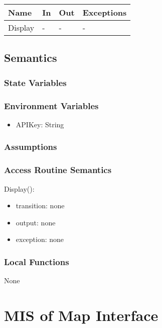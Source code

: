 \documentclass[12pt, titlepage]{article}
\begin{document}
\begin{itemize}
\begin{center}
\begin{tabular}{p{2cm} p{4cm} p{4cm} p{2cm}}
\hline
\textbf{Name} & \textbf{In} & \textbf{Out} & \textbf{Exceptions} \\
\hline
Display & - & - & - \\

\hline
\end{tabular}
\end{center}

\subsection{Semantics}

\subsubsection{State Variables}

\subsubsection{Environment Variables}

\begin{itemize}
\item APIKey: String
\end{itemize}

\subsubsection{Assumptions}

\subsubsection{Access Routine Semantics}

\noindent Display():
\begin{itemize}
\item transition: none
\item output: none
\item exception: none
\end{itemize}

\subsubsection{Local Functions}

None

\newpage

\section{MIS of Map Interface} \label{mMapInterface}


\end{itemize}
\end{document}

